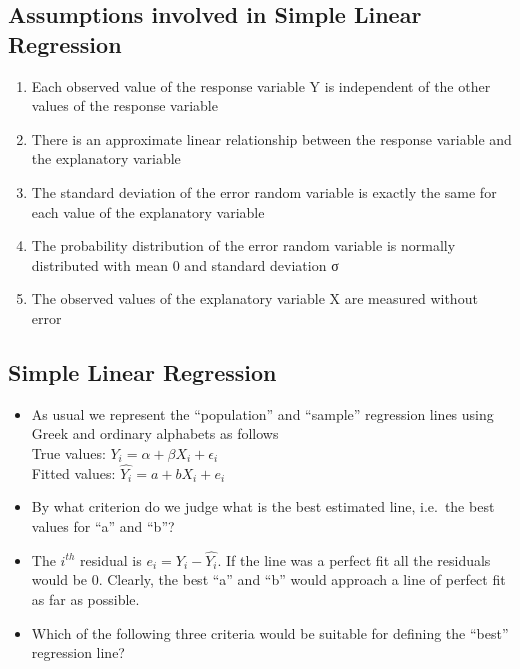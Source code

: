 \documentclass[
]{book}
\providecommand{\tightlist}{%
  \setlength{\itemsep}{0pt}\setlength{\parskip}{0pt}}
\begin{document}
\hypertarget{assumptions-involved-in-simple-linear-regression}{%
\subsection{Assumptions involved in Simple Linear Regression}\label{assumptions-involved-in-simple-linear-regression}}

\begin{enumerate}
\def\labelenumi{\arabic{enumi}.}
\item
  Each observed value of the response variable Y is independent of the other values of the response variable
\item
  There is an approximate linear relationship between the response variable and the explanatory variable
\item
  The standard deviation of the error random variable is exactly the same for each value of the explanatory variable
\item
  The probability distribution of the error random variable is normally distributed with mean 0 and standard deviation σ
\item
  The observed values of the explanatory variable X are measured without error
\end{enumerate}

\hypertarget{simple-linear-regression-1}{%
\subsection{Simple Linear Regression}\label{simple-linear-regression-1}}

\begin{itemize}
\tightlist
\item
  As usual we represent the ``population'' and ``sample'' regression lines using Greek and ordinary alphabets as follows\\
  True values: \(Y_i=\alpha+\beta X_i+\epsilon_i\)\\
  Fitted values: \(\hat{Y_i}=a+bX_i+e_i\)
\item
  By what criterion do we judge what is the best estimated line, i.e.~the best values for ``a'' and ``b''?
\item
  The \(i^{th}\) residual is \(e_i = Y_i-\hat{Y_i}\). If the line was a perfect fit all the residuals would be 0. Clearly, the best ``a'' and ``b'' would approach a line of perfect fit as far as possible.
\item
  Which of the following three criteria would be suitable for defining the ``best'' regression line?
\end{itemize}
\end{document}
